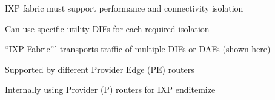     \item IXP fabric must support performance and connectivity isolation
    \item Can use specific utility DIFs for each required isolation
    \item ``IXP Fabric''' transports traffic of multiple DIFs or DAFs (shown here)
    \item Supported by different Provider Edge (PE) routers
    \item Internally using Provider (P) routers for IXP 
end{itemize}

